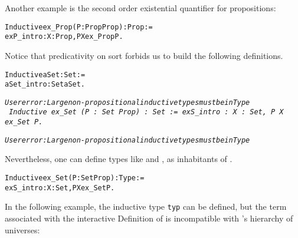 \documentclass[11pt]{article}
\begin{document}
Another example is the second order existential quantifier for propositions:

\begin{alltt}
Inductive ex_Prop  (P : Prop {\arrow} Prop) : Prop :=
  exP_intro : {\prodsym} X : Prop, P X {\arrow} ex_Prop P.
\end{alltt}







Notice that predicativity on sort  forbids us to build
the following definitions.


\begin{alltt}
Inductive aSet : Set :=
  aSet_intro: Set {\arrow} aSet.

\it{}User error: Large non-propositional inductive types must be in Type
\tt
Inductive ex_Set  (P : Set {\arrow} Prop) : Set :=
  exS_intro : {\prodsym} X : Set, P X {\arrow} ex_Set P.

\it{}User error: Large non-propositional inductive types must be in Type
\end{alltt}

Nevertheless, one can define types like  and , as inhabitants of .

\begin{alltt}
Inductive ex_Set  (P : Set {\arrow} Prop) : Type :=
  exS_intro : {\prodsym} X : Set, P X {\arrow} ex_Set P.
\end{alltt}

In the following example, the inductive type \texttt{typ} can be defined,
but the term associated with the interactive Definition of
 is incompatible with {\coq}'s hierarchy of universes:
\end{document}
